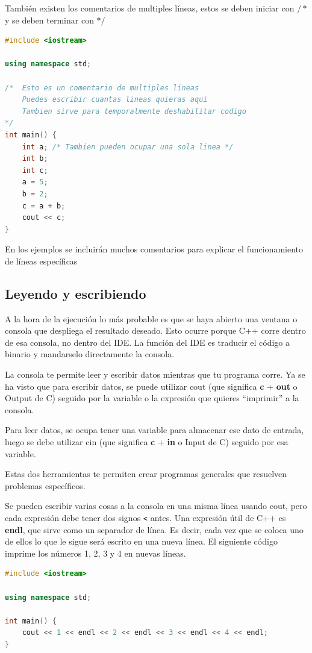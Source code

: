 \documentclass{article}
\begin{document}
También existen los comentarios de multiples líneas, estos se deben iniciar con $/*$ y se deben terminar con $*/$

\begin{lstlisting}[language=C++, title=Comentarios]
#include <iostream>

using namespace std;

/*  Esto es un comentario de multiples lineas
    Puedes escribir cuantas lineas quieras aqui
    Tambien sirve para temporalmente deshabilitar codigo
*/
int main() {
	int a; /* Tambien pueden ocupar una sola linea */
	int b;
	int c;
	a = 5;
	b = 2;
	c = a + b;
	cout << c;
}
\end{lstlisting}

En los ejemplos se incluirán muchos comentarios para explicar el funcionamiento de líneas específicas

\subsection{Leyendo y escribiendo}

A la hora de la ejecución lo más probable es que se haya abierto una ventana o consola que despliega el resultado deseado. Esto ocurre porque C++ corre dentro de esa consola, no dentro del IDE. La función del IDE es traducir el código a binario y mandarselo directamente la consola.

La consola te permite leer y escribir datos mientras que tu programa corre. Ya se ha visto que para escribir datos, se puede utilizar cout (que significa \textbf{c} + \textbf{out} o Output de C) seguido por la variable o la expresión que quieres ``imprimir'' a la consola.

Para leer datos, se ocupa tener una variable para almacenar ese dato de entrada, luego se debe utilizar cin (que significa \textbf{c} + \textbf{in} o Input de C) seguido por esa variable.

Estas dos herramientas te permiten crear programas generales que resuelven problemas específicos.

Se pueden escribir varias cosas a la consola en una misma línea usando cout, pero cada expresión debe tener dos signos \lstinline{<} antes. Una expresión útil de C++ es \textbf{endl}, que sirve como un separador de línea. Es decir, cada vez que se coloca uno de ellos lo que le sigue será escrito en una nueva línea. El siguiente código imprime los números 1, 2, 3 y 4 en nuevas líneas.

\begin{lstlisting}[language=C++, title=Uno a cuatro]
#include <iostream>

using namespace std;

int main() {
	cout << 1 << endl << 2 << endl << 3 << endl << 4 << endl;
}
\end{lstlisting}
\end{document}
